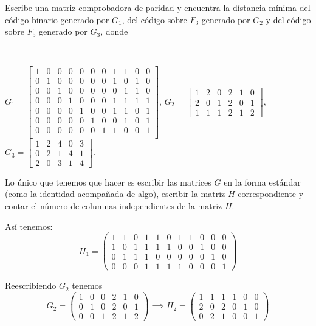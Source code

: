 \begin{problem}[16]  Escribe una matriz comprobadora de paridad y encuentra la
dístancia mínima del código binario generado por $G_1$, del código
sobre $ F_3$ generado por $G_2$ y del código sobre $ F_5$ generado
por $G_3$, donde

\

$G_1=\left[\begin{array}{ccccccccccc}
1&0&0&0&0&0&0& 1&1&0&0\\
0&1&0&0&0&0&0& 1&0&1&0\\
0&0&1&0&0&0&0& 0&1&1&0\\
0&0&0&1&0&0&0& 1&1&1&1\\
0&0&0&0&1&0&0& 1&1&0&1\\
0&0&0&0&0&1&0& 0&1&0&1\\
0&0&0&0&0&0&1& 1&0&0&1\\
\end{array}\right]$,
\hspace{0.2cm}
$ G_2=\left[\begin{array}{cccccc}
1&2&0&2&1&0\\2&0&1&2&0&1\\1&1&1&2&1&2\end{array}\right]$,
\hspace{0.2cm}
$
G_3=\left[\begin{array}{ccccc} 1&2&4&0&3\\0&2&1&4&1\\2&0&3&1&4
\end{array}\right].$
\solution


Lo único que tenemos que hacer es escribir las matrices $G$ en la forma estándar (como la identidad acompañada de algo), escribir la matriz $H$ correspondiente y contar el número de columnas independientes de la matriz $H$.

Así tenemos:
\[H_1=\left(\begin{array}{ccccccccccc}
1 & 1 & 0 & 1 & 1 & 0 & 1 & 1 & 0 & 0 & 0\\
1 & 0 & 1 & 1 & 1 & 1 & 0 & 0 & 1 & 0 & 0\\
0 & 1 & 1 & 1 & 0 & 0 & 0 & 0 & 0 & 1 & 0\\
0 & 0 & 0 & 1 & 1 & 1 & 1 & 0 & 0 & 0 & 1
\end{array}\right)\]

Reescribiendo $G_2$ tenemos
\[G_2=\left(\begin{array}{cccccc}
1 & 0 & 0 & 2 & 1 & 0 \\
0 & 1 & 0 & 2 & 0 & 1 \\
0 & 0 & 1 & 2 & 1 & 2
\end{array}\right) \implies H_2 = \left(\begin{array}{cccccc}
1 & 1 & 1 & 1 & 0 & 0 \\
2 & 0 & 2 & 0 & 1 & 0 \\
0 & 2 & 1 & 0 & 0 & 1
\end{array}\right)\]


\end{problem}
